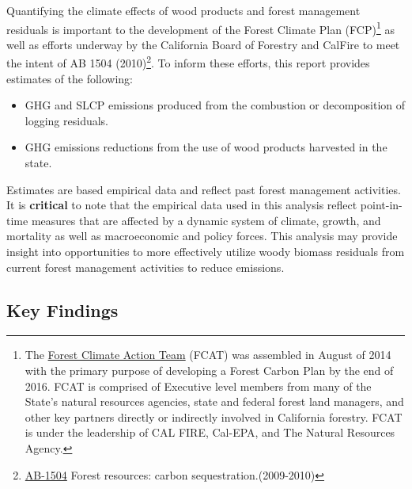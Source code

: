 \documentclass[a4paper]{article}
\begin{document}
Quantifying the climate effects of wood products and forest management
residuals is important to the development of the Forest Climate Plan
(FCP)\footnote{The \href{http://www.fire.ca.gov/fcat/}{Forest Climate Action Team} (FCAT) was assembled in August of 2014 with the primary purpose of developing a Forest Carbon Plan by the end of 2016. FCAT is comprised of Executive level members from many of the State’s natural resources agencies, state and federal forest land managers, and other key partners directly or indirectly involved in California forestry. FCAT is under the leadership of CAL FIRE, Cal-EPA, and The Natural Resources Agency.} as well as efforts underway by the California Board of
Forestry and CalFire to meet the intent of AB 1504 (2010)\footnote{\href{http://leginfo.legislature.ca.gov/faces/billTextClient.xhtml?bill_id=200920100AB1504}{AB-1504} Forest resources: carbon sequestration.(2009-2010)}. To
inform these efforts, this report provides estimates of the following:

\begin{itemize}
\item GHG and SLCP emissions produced from the combustion or
decomposition of logging residuals.
\item GHG emissions reductions from the use of wood products harvested in
the state.
\end{itemize}


Estimates are based empirical data and reflect past forest
management activities. It is \textbf{critical} to note that the empirical
data used in this analysis reflect point-in-time measures that are
affected by a dynamic system of climate, growth, and mortality as well as macroeconomic and policy forces. This analysis may provide insight into
opportunities to more effectively utilize woody biomass residuals from
current forest management activities to reduce emissions. 


\subsection{Key Findings}
\label{sec-1-1}
\end{document}
